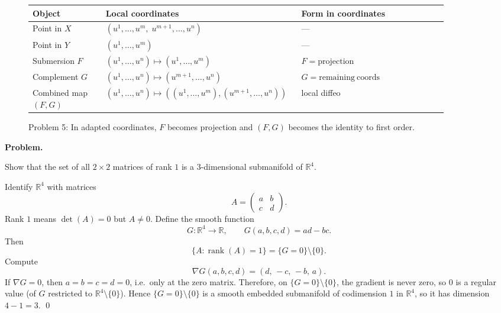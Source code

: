 \begin{solution}
\begin{figure}[htbp]
	\centering
	\renewcommand{\arraystretch}{1.35}
	\begin{tabular}{|
>{\raggedright\arraybackslash}p{0.17\linewidth}|
>{\raggedright\arraybackslash}p{0.39\linewidth}|
>{\raggedright\arraybackslash}p{0.34\linewidth}|}
		\hline
		\textbf{Object} & \textbf{Local coordinates} & \textbf{Form in coordinates} \\
		\hline
		Point in $X$ & $(u^1,\dots,u^m,\; u^{m+1},\dots,u^n)$ & --- \\
		\hline
		Point in $Y$ & $(u^1,\dots,u^m)$ & --- \\
		\hline
		Submersion $F$ & $(u^1,\dots,u^n)\mapsto (u^1,\dots,u^m)$ & $F=\mathrm{projection}$ \\
		\hline
		Complement $G$ & $(u^1,\dots,u^n)\mapsto (u^{m+1},\dots,u^n)$ & $G=\mathrm{remaining\ coords}$ \\
		\hline
		Combined map $(F,G)$ & $(u^1,\dots,u^n)\mapsto ((u^1,\dots,u^m),(u^{m+1},\dots,u^n))$ & local diffeo \\
		\hline
	\end{tabular}
	\caption{Problem 5: In adapted coordinates, $F$ becomes projection and $(F,G)$ becomes the identity to first order.}
\end{figure}
\end{solution}

\begin{problem}
\label{prob:cp-vii-0020}
\par\medskip\noindent\textbf{Problem.}\par\smallskip

Show that the set of all $2\times 2$ matrices of rank $1$ is a $3$-dimensional submanifold of $\mathbb{R}^4$.
\end{problem}

\begin{solution}
Identify $\mathbb{R}^4$ with matrices
\[
A=\begin{pmatrix}a&b\\ c&d\end{pmatrix}.
\]
Rank $1$ means $\det(A)=0$ but $A\neq 0$. Define the smooth function
\[
G:\mathbb{R}^4\to\mathbb{R},\qquad G(a,b,c,d)=ad-bc.
\]
Then
\[
\{A:\operatorname{rank}(A)=1\}=\{G=0\}\setminus\{0\}.
\]
Compute
\[
\nabla G(a,b,c,d)=(d,\,-c,\,-b,\,a).
\]
If $\nabla G=0$, then $a=b=c=d=0$, i.e.\ only at the zero matrix.
Therefore, on $\{G=0\}\setminus\{0\}$, the gradient is never zero, so $0$ is a regular value
(of $G$ restricted to $\mathbb{R}^4\setminus\{0\}$). Hence $\{G=0\}\setminus\{0\}$ is a smooth
embedded submanifold of codimension $1$ in $\mathbb{R}^4$, so it has dimension $4-1=3$.
\qed

\end{solution}

